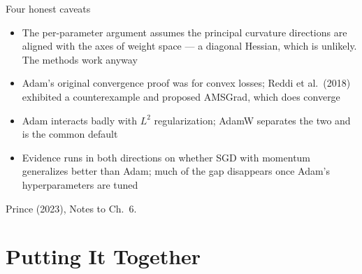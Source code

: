 \documentclass[aspectratio=169, 11pt]{beamer}
\newcommand{\srcline}[1]{%
  \par\vspace{0.25em}%
  {\scriptsize\color{mcMuted}\hfill #1\par}}
\newcommand{\src}[3]{}      %
\begin{document}
\begin{frame}{Four honest caveats}
  \src{prince2023}{page}{93-94}
  \src{bishop2024}{section}{7.3.3}
  \src{reddi2018}{section}{3}
  \src{reddi2018}{section}{4}
  \src{loshchilov2019}{algorithm}{2}
  \src{loshchilov2019}{section}{2}
  \begin{itemize}\itemsep0.3em
    \item The per-parameter argument assumes the principal curvature
          directions are \alert{aligned with the axes} of weight space
          --- a diagonal Hessian, which is unlikely. The methods work
          anyway
    \item Adam's original convergence proof was for convex losses;
          Reddi et al.~(2018) exhibited a counterexample and proposed
          AMSGrad, which does converge
    \item Adam interacts badly with $L^2$ regularization; AdamW
          separates the two and is the common default
    \item Evidence runs in both directions on whether SGD with momentum
          generalizes better than Adam; much of the gap disappears once
          Adam's hyperparameters are tuned
  \end{itemize}
  \srcline{Prince (2023), Notes to Ch.~6.}
\end{frame}

\section{Putting It Together}
\end{document}
